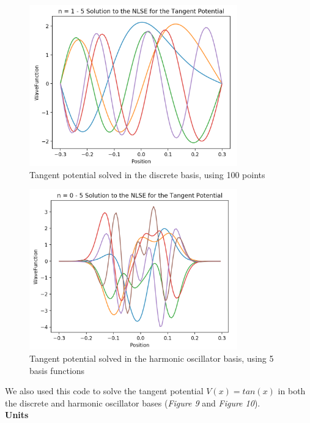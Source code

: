 \documentclass[%
 reprint,
 amsmath,amssymb,
 aps,
]{revtex4-1}
\begin{document}
\begin{figure}
\includegraphics[width=9cm]{DiscreteBasisTangent}
\caption{Tangent potential solved in the discrete basis, using 100 points}
\end{figure}
\begin{figure}
\includegraphics[width=9cm]{HOBasisTangent}
\caption{Tangent potential solved in the harmonic oscillator basis, using 5 basis functions}
\end{figure}

\noindent We also used this code to solve the tangent potential $V(x) = tan(x)$ in both the discrete and harmonic oscillator bases (\textit{Figure 9} and \textit{Figure 10}).\\

\noindent \textbf{Units}\\
\end{document}
